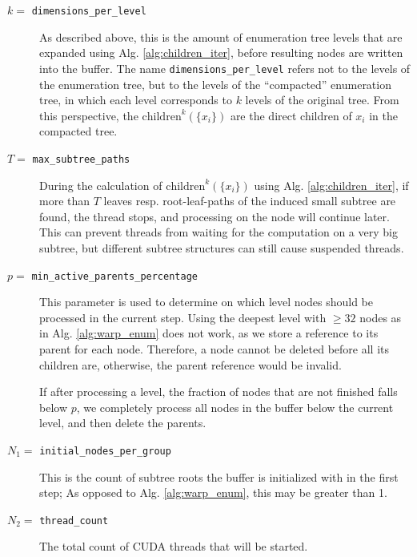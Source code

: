 \documentclass{scrartcl}
\begin{document}
    \begin{description}
        \item[$k =$ \texttt{dimensions\_per\_level}]
            As described above, this is the amount of enumeration tree levels that are expanded using Alg. \ref{alg:children_iter}, before resulting nodes are written into the buffer. The name \texttt{dimensions\_per\_level} refers not to the levels of the enumeration tree, but to the levels of the ``compacted'' enumeration tree, in which each level corresponds to $k$ levels of the original tree. From this perspective, the $\mathrm{children}^k(\{x_i\})$ are the direct children of $x_i$ in the compacted tree.
        \item[$T =$ \texttt{max\_subtree\_paths}] 
            During the calculation of $\mathrm{children}^k(\{x_i\})$ using Alg. \ref{alg:children_iter}, if more than $T$ leaves resp. root-leaf-paths of the induced small subtree are found, the thread stops, and processing on the node will continue later. This can prevent threads from waiting for the computation on a very big subtree, but different subtree structures can still cause suspended threads. 
        \item[$p =$ \texttt{min\_active\_parents\_percentage}]
            This parameter is used to determine on which level nodes should be processed in the current step. Using the deepest level with $\geq 32$ nodes as in Alg. \ref{alg:warp_enum} does not work, as we store a reference to its parent for each node. Therefore, a node cannot be deleted before all its children are, otherwise, the parent reference would be invalid. 
            
            If after processing a level, the fraction of nodes that are not finished falls below $p$, we completely process all nodes in the buffer below the current level, and then delete the parents.
        \item[$N_1 =$ \texttt{initial\_nodes\_per\_group}]
            This is the count of subtree roots the buffer is initialized with in the first step; As opposed to Alg. \ref{alg:warp_enum}, this may be greater than 1.
        \item[$N_2 =$ \texttt{thread\_count}]
            The total count of CUDA threads that will be started. 
    \end{description}
\end{document}
